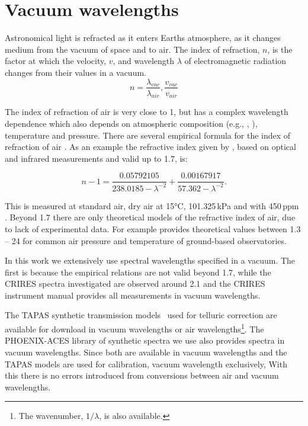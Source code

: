 
\chapter{Vacuum wavelengths}
Astronomical light is refracted as it enters Earths atmosphere, as it changes medium from the vacuum of space and to air. The index of refraction, \(n\), is the factor at which the velocity, \(v\), and wavelength \(\lambda\) of electromagnetic radiation changes from their values in a vacuum.
\begin{equation}
n  = \frac{\lambda_{vac}}{\lambda_{air}}, \frac{v_{vac}}{v_{air}}
\end{equation}

The index of refraction of air is very close to 1, but has a complex wavelength dependence which also depends on atmospheric composition (e.g., , ), temperature and pressure.
There are several empirical formula for the index of refraction of air \citep[e.g.,][]{edlen_dispersion_1953, peck_dispersion_1972, ciddor_refractive_1996}. As an example the refractive index given by \citet{ciddor_refractive_1996}, based on optical and infrared measurements and valid up to 1.7\mum{}, is:

\begin{equation}
    n -1 = \frac{0.05792105}{238.0185 - \lambda^{-2}} + \frac{0.00167917}{57.362 - \lambda^{-2}}.
\end{equation}

This is measured at standard air, dry air at 15\si{\degreeCelsius}, 101.325\,\si{\kilo\pascal} and with 450\,ppm .
Beyond 1.7\mum{} there are only theoretical models of the refractive index of air, due to lack of experimental data. For example \citet{mathar_refractive_2007} provides theoretical values between 1.3 -- 24\mum{} for common air pressure and temperature of ground-based observatories.

In this work we extensively use spectral wavelengths specified in a vacuum. The first is because the empirical relations are not valid beyond 1.7\mum{}, while the {CRIRES} spectra investigated are observed around 2.1\mum{} and the {CRIRES} instrument manual provides all measurements in vacuum wavelengths.

The {TAPAS} synthetic transmission models~\citet{bertaux_tapas_2014} used for telluric correction are available for download in vacuum wavelengths or air wavelengths\footnote{The wavenumber, \(1/\lambda\), is also available.}. The {PHOENIX-ACES} library of synthetic spectra we use also provides spectra in vacuum wavelengths.
Since both are available in vacuum wavelengths and the {TAPAS} models are used for calibration, vacuum wavelength exclusively, With this there is no errors introduced from conversions between air and vacuum wavelengths.
